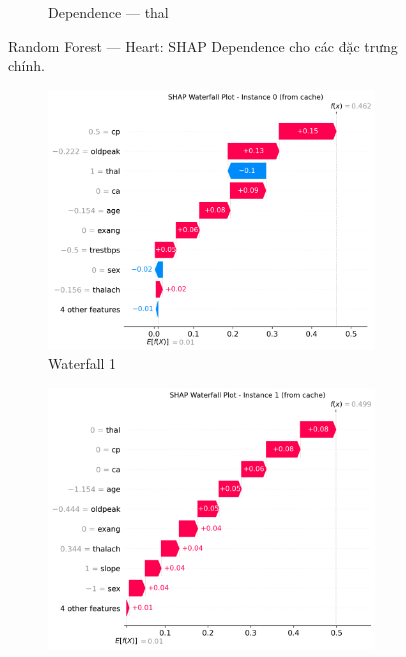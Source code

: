 \begin{figure}[H]
\begin{subfigure}[b]{0.31\textwidth}
\caption{Dependence — thal}
\label{fig:rf_heart_dep_thal}
\end{subfigure}
\caption{Random Forest — Heart: SHAP Dependence cho các đặc trưng chính.}
\label{fig:rf_heart_dependences}
\end{figure}

\begin{figure}[H]
\centering
\begin{subfigure}[b]{0.31\textwidth}
\centering
\includegraphics[width=0.95\textwidth]{Result/heart_dataset/RF/SHAP/Waterfall 1.png}
\caption{Waterfall 1}
\label{fig:rf_heart_waterfall1}
\end{subfigure}\hfill
\begin{subfigure}[b]{0.31\textwidth}
\centering
\includegraphics[width=0.95\textwidth]{Result/heart_dataset/RF/SHAP/Waterfall 2.png}

\end{subfigure}
\end{figure}
